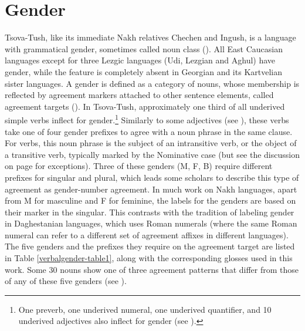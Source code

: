 \section{Gender} \label{verbalgender}

Tsova-Tush, like its immediate Nakh relatives Chechen and Ingush, is a language with grammatical gender, sometimes called noun class (\cite{gagua52}). All East Caucasian languages except for three Lezgic languages (Udi, Lezgian and Aghul) have gender, while the feature is completely absent in Georgian and its Kartvelian sister languages. A gender is defined as a category of nouns, whose membership is reflected by agreement markers attached to other sentence elements, called agreement targets (\cite[146--147]{corbett91}). In Tsova-Tush, approximately one third of all underived simple verbs  inflect for gender.\footnote{One preverb, one underived numeral, one underived quantifier, and 10 underived adjectives also inflect for gender (see ).} 
Similarly to some adjectives (see ), these verbs take one of four gender prefixes to agree with a noun phrase in the same clause. For verbs, this noun phrase is the subject of an intransitive verb, or the object of a transitive verb, typically marked by the Nominative case (but see the discussion on page \pageref{ergintrans} for exceptions). Three of these genders (M, F, B) require different prefixes for singular and plural, which leads some scholars to describe this type of agreement as gender-number agreement. In much work on Nakh languages, apart from M for masculine and F for feminine, the labels for the genders are based on their marker in the singular. This contrasts with the tradition of labeling gender in Daghestanian languages, which uses Roman numerals (where the same Roman numeral can refer to a different set of agreement affixes in different languages). The five genders and the prefixes they require on the agreement target are listed in Table \ref{verbalgender-table1}, along with the corresponding glosses used in this work. Some 30 nouns show one of three agreement patterns that differ from those of any of these five genders (see \cites[163]{holiskygagua}[170--172]{corbett91}{WS}).

